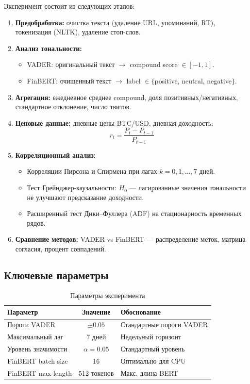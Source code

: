 \documentclass[a4paper,12pt]{article}
\begin{document}
Эксперимент состоит из следующих этапов:

\begin{enumerate}
  \item \textbf{Предобработка:} очистка текста (удаление URL, упоминаний, RT),
        токенизация (NLTK), удаление стоп-слов.
  \item \textbf{Анализ тональности:}
    \begin{itemize}
      \item VADER: оригинальный текст $\rightarrow$ compound score $\in [-1, 1]$.
      \item FinBERT: очищенный текст $\rightarrow$ label $\in \{$positive, neutral, negative$\}$.
    \end{itemize}
  \item \textbf{Агрегация:} ежедневное среднее compound, доля позитивных/негативных,
        стандартное отклонение, число твитов.
  \item \textbf{Ценовые данные:} дневные цены BTC/USD, дневная доходность:
    \begin{equation}
      r_t = \frac{P_t - P_{t-1}}{P_{t-1}}
    \end{equation}
  \item \textbf{Корреляционный анализ:}
    \begin{itemize}
      \item Корреляции Пирсона и Спирмена при лагах $k = 0, 1, \ldots, 7$ дней.
      \item Тест Грейнджер-каузальности: $H_0$ --- лагированные значения тональности
            не улучшают предсказание доходности.
      \item Расширенный тест Дики--Фуллера (ADF) на стационарность временных рядов.
    \end{itemize}
  \item \textbf{Сравнение методов:} VADER vs FinBERT --- распределение меток,
        матрица согласия, процент совпадений.
\end{enumerate}

\subsection{Ключевые параметры}

\begin{table}[H]
\centering
\caption{Параметры эксперимента}
\label{tab:params}
\begin{tabular}{|l|c|l|}
\hline
\textbf{Параметр} & \textbf{Значение} & \textbf{Обоснование} \\
\hline
Пороги VADER & $\pm 0.05$ & Стандартные пороги VADER \\
\hline
Максимальный лаг & 7 дней & Недельный горизонт \\
\hline
Уровень значимости & $\alpha = 0.05$ & Стандартный уровень \\
\hline
FinBERT batch size & 16 & Оптимально для CPU \\
\hline
FinBERT max length & 512 токенов & Макс. длина BERT \\
\hline
\end{tabular}
\end{table}
\end{document}
